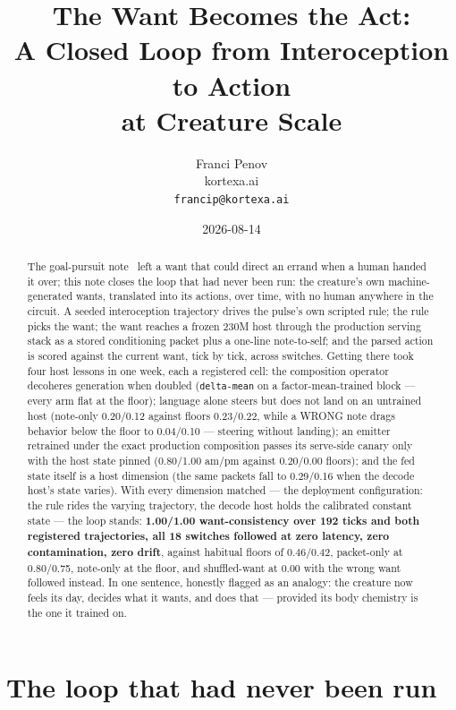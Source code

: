 \documentclass[11pt]{article}
\title{The Want Becomes the Act:\\A Closed Loop from Interoception to Action\\at Creature Scale}
\author{Franci Penov \\ kortexa.ai \\ \texttt{francip@kortexa.ai}}
\date{2026-08-14}
\begin{document}
\maketitle

\begin{abstract}
The goal-pursuit note~\cite{penov2026hostblock} left a want that could
direct an errand when a human handed it over; this note closes the loop
that had never been run: the creature's own machine-generated wants,
translated into its actions, over time, with no human anywhere in the
circuit. A seeded interoception trajectory drives the pulse's own
scripted rule; the rule picks the want; the want reaches a frozen 230M
host through the production serving stack as a stored conditioning
packet plus a one-line note-to-self; and the parsed action is scored
against the current want, tick by tick, across switches. Getting there
took four host lessons in one week, each a registered cell: the
composition operator decoheres generation when doubled
(\texttt{delta-mean} on a factor-mean-trained block --- every arm flat
at the floor); language alone steers but does not land on an untrained
host (note-only 0.20/0.12 against floors 0.23/0.22, while a WRONG
note drags behavior below the floor to 0.04/0.10 --- steering
without landing); an emitter retrained under the exact production
composition passes its serve-side canary only with the host state
pinned (0.80/1.00 am/pm against
0.20/0.00 floors); and the fed state
itself is a host dimension (the same packets fall to 0.29/0.16 when
the decode host's state varies). With every dimension matched --- the
deployment configuration: the rule rides the varying trajectory, the
decode host holds the calibrated constant state --- the loop stands:
\textbf{1.00/1.00 want-consistency over 192 ticks and both registered
trajectories, all 18 switches followed at zero latency, zero
contamination, zero drift}, against habitual floors of 0.46/0.42,
packet-only at 0.80/0.75, note-only at the floor, and shuffled-want at
0.00 with the wrong want followed instead. In one sentence, honestly
flagged as an analogy: the creature now feels its day, decides what it
wants, and does that --- provided its body chemistry is the one it
trained on.
\end{abstract}

\section{The loop that had never been run}
\end{document}
